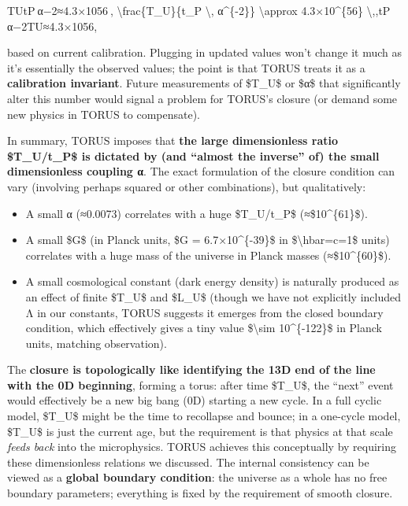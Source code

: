 \documentclass[]{article}
\begin{document}
TUtP α−2≈4.3×1056 , \textbackslash{}frac\{T\_U\}\{t\_P \textbackslash{},
α\^{}\{-2\}\} \textbackslash{}approx 4.3×10\^{}\{56\}
\textbackslash{},,tP​α−2TU​​≈4.3×1056,

based on current calibration. Plugging in updated values won't change it
much as it's essentially the observed values; the point is that TORUS
treats it as a \textbf{calibration invariant}. Future measurements of
\$T\_U\$ or \$α\$ that significantly alter this number would signal a
problem for TORUS's closure (or demand some new physics in TORUS to
compensate)​.

In summary, TORUS imposes that \textbf{the large dimensionless ratio
\$T\_U/t\_P\$ is dictated by (and ``almost the inverse'' of) the small
dimensionless coupling α}​. The exact formulation of the closure
condition can vary (involving perhaps squared or other combinations),
but qualitatively:

\begin{itemize}
\item
  A small α (≈0.0073) correlates with a huge \$T\_U/t\_P\$
  (≈\$10\^{}\{61\}\$).
\item
  A small \$G\$ (in Planck units, \$G = 6.7×10\^{}\{-39\}\$ in
  \$\textbackslash{}hbar=c=1\$ units) correlates with a huge mass of the
  universe in Planck masses (≈\$10\^{}\{60\}\$).
\item
  A small cosmological constant (dark energy density) is naturally
  produced as an effect of finite \$T\_U\$ and \$L\_U\$ (though we have
  not explicitly included Λ in our constants, TORUS suggests it emerges
  from the closed boundary condition, which effectively gives a tiny
  value \$\textbackslash{}sim 10\^{}\{-122\}\$ in Planck units, matching
  observation).
\end{itemize}

The \textbf{closure is topologically like identifying the 13D end of the
line with the 0D beginning}, forming a torus: after time \$T\_U\$, the
``next'' event would effectively be a new big bang (0D) starting a new
cycle​. In a full cyclic model, \$T\_U\$ might be the time to recollapse
and bounce; in a one-cycle model, \$T\_U\$ is just the current age, but
the requirement is that physics at that scale \emph{feeds back} into the
microphysics. TORUS achieves this conceptually by requiring these
dimensionless relations we discussed. The internal consistency can be
viewed as a \textbf{global boundary condition}: the universe as a whole
has no free boundary parameters; everything is fixed by the requirement
of smooth closure​.
\end{document}
